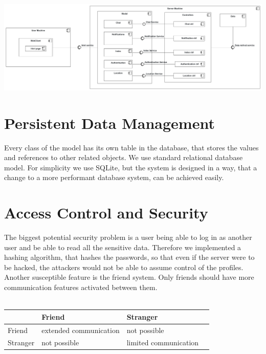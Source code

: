 \documentclass[a4paper,12pt]{scrartcl}
\begin{document}
    
    
    \includegraphics[scale=0.15]{HardwareSoftware.png}
    
    


    \section{Persistent Data Management}
    
    Every class of the model has its own table in the database, that stores the values and references to other related objects. We use standard relational database model. For simplicity we use SQLite, but the system is designed in a way, that a change to a more performant database system, can be achieved easily. 
    
    


    \section{Access Control and Security}
    
    The biggest potential security problem is a user being able to log in as another user and be able to read all the sensitive data. Therefore we implemented a hashing algorithm, that hashes the passwords, so that even if the server were to be hacked, the attackers would not be able to assume control of the profiles. Another susceptible feature is the friend system. Only friends should have more communication features activated between them. \\ \\
    
    \begin{tabular}{    
	    |p{}%
        |p{}%
        |p{}
        |p{}|%
    }
        \hline
         & Friend & Stranger         \\
        \hline
        Friend   & extended communication  & not possible \\
        \hline
        Stranger & not possible & limited communication         \\
       
        \hline
    \end{tabular}
\end{document}
